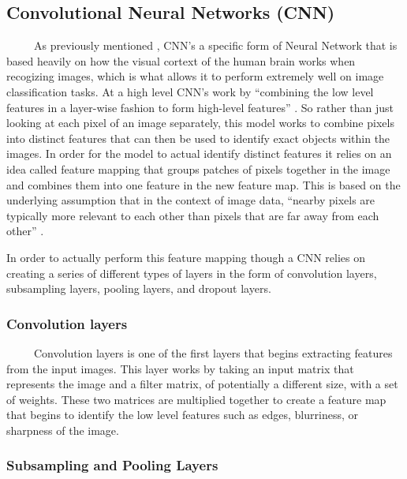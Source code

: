 \documentclass[12pt]{article}
\begin{document}
\hypertarget{convolutional-neural-networks-cnn}{%
\subsection{Convolutional Neural Networks
(CNN)}\label{convolutional-neural-networks-cnn}}

~~~~~As previously mentioned , CNN's a specific form of Neural Network
that is based heavily on how the visual cortext of the human brain works
when recogizing images, which is what allows it to perform extremely
well on image classification tasks. At a high level CNN's work by
``combining the low level features in a layer-wise fashion to form
high-level features'' \citet{PML}. So rather than just looking at each
pixel of an image separately, this model works to combine pixels into
distinct features that can then be used to identify exact objects within
the images. In order for the model to actual identify distinct features
it relies on an idea called feature mapping that groups patches of
pixels together in the image and combines them into one feature in the
new feature map. This is based on the underlying assumption that in the
context of image data, ``nearby pixels are typically more relevant to
each other than pixels that are far away from each other'' \citet{PML}.

In order to actually perform this feature mapping though a CNN relies on
creating a series of different types of layers in the form of
convolution layers, subsampling layers, pooling layers, and dropout
layers.

\hypertarget{convolution-layers}{%
\subsubsection{Convolution layers}\label{convolution-layers}}

~~~~~Convolution layers is one of the first layers that begins
extracting features from the input images. This layer works by taking an
input matrix that represents the image and a filter matrix, of
potentially a different size, with a set of weights. These two matrices
are multiplied together to create a feature map that begins to identify
the low level features such as edges, blurriness, or sharpness of the
image.

\hypertarget{subsampling-and-pooling-layers}{%
\subsubsection{Subsampling and Pooling
Layers}\label{subsampling-and-pooling-layers}}
\end{document}
